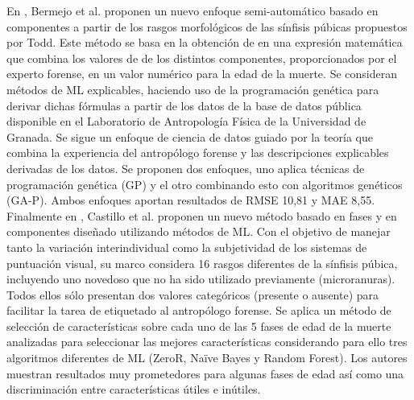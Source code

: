En \cite{villegas_TFG}, Bermejo et al. proponen un nuevo enfoque semi-automático basado en componentes a partir de los rasgos morfológicos de las sínfisis púbicas propuestos por Todd. Este método se basa en la obtención de en una expresión matemática que combina los valores de de los distintos componentes, proporcionados por el experto forense, en un valor numérico para la edad de la muerte. Se consideran métodos de ML explicables, haciendo uso de la programación genética para derivar dichas fórmulas a partir de los datos de la base de datos pública disponible en el Laboratorio de Antropología Física de la Universidad de Granada. Se sigue un enfoque de ciencia de datos guiado por la teoría \cite{karpatne2017theory} que combina la experiencia del antropólogo forense y las descripciones explicables derivadas de los datos. Se proponen dos enfoques, uno aplica técnicas de programación genética (GP) y el otro combinando esto con algoritmos genéticos (GA-P). Ambos enfoques aportan resultados de RMSE 10,81 y MAE 8,55.
\\

Finalmente en \cite{castillo2021preliminary}, Castillo et al. proponen un nuevo método basado en fases y en componentes diseñado utilizando métodos de ML. Con el objetivo de manejar tanto la variación interindividual como la subjetividad de los sistemas de puntuación visual, su marco considera 16 rasgos diferentes de la sínfisis púbica, incluyendo uno novedoso que no ha sido utilizado previamente (microranuras). Todos ellos sólo presentan dos valores categóricos (presente o ausente) para facilitar la tarea de etiquetado al antropólogo forense. Se aplica un método de selección de características sobre cada uno de las 5 fases de edad de la muerte analizadas para seleccionar las mejores características considerando para ello tres algoritmos diferentes de ML (ZeroR, Naïve Bayes y Random Forest). Los autores muestran resultados muy prometedores para algunas fases de edad así como una discriminación entre características útiles e inútiles.\\


